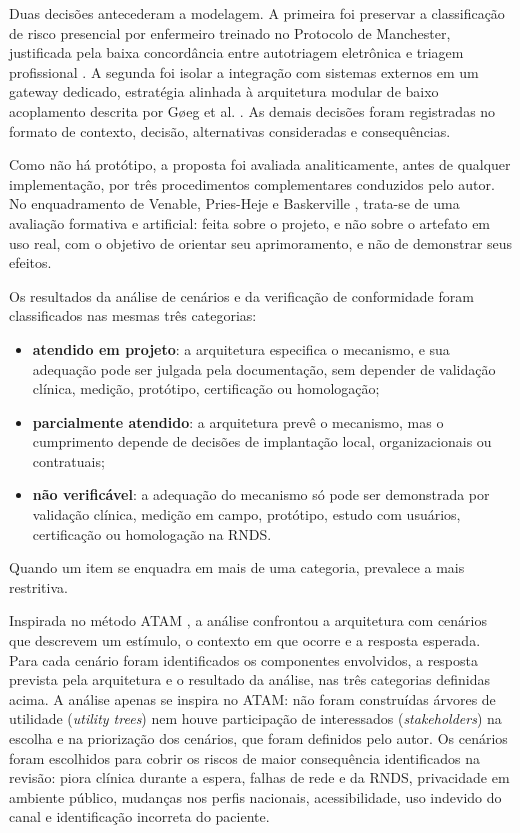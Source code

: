 Duas decisões antecederam a modelagem. A primeira foi preservar a classificação de risco presencial por enfermeiro treinado no Protocolo de Manchester, justificada pela baixa concordância entre autotriagem eletrônica e triagem profissional \cite{dickson2022}. A segunda foi isolar a integração com sistemas externos em um gateway dedicado, estratégia alinhada à arquitetura modular de baixo acoplamento descrita por Gøeg et al. \cite{goeg2018}. As demais decisões foram registradas no formato de contexto, decisão, alternativas consideradas e consequências.


Como não há protótipo, a proposta foi avaliada analiticamente, antes de qualquer implementação, por três procedimentos complementares conduzidos pelo autor. No enquadramento de Venable, Pries-Heje e Baskerville \cite{venable2016}, trata-se de uma avaliação formativa e artificial: feita sobre o projeto, e não sobre o artefato em uso real, com o objetivo de orientar seu aprimoramento, e não de demonstrar seus efeitos.

Os resultados da análise de cenários e da verificação de conformidade foram classificados nas mesmas três categorias:
\begin{itemize}
    \item \textbf{atendido em projeto}: a arquitetura especifica o mecanismo, e sua adequação pode ser julgada pela documentação, sem depender de validação clínica, medição, protótipo, certificação ou homologação;
    \item \textbf{parcialmente atendido}: a arquitetura prevê o mecanismo, mas o cumprimento depende de decisões de implantação local, organizacionais ou contratuais;
    \item \textbf{não verificável}: a adequação do mecanismo só pode ser demonstrada por validação clínica, medição em campo, protótipo, estudo com usuários, certificação ou homologação na RNDS.
\end{itemize}
Quando um item se enquadra em mais de uma categoria, prevalece a mais restritiva.


Inspirada no método ATAM \cite{kazman1998}, a análise confrontou a arquitetura com cenários que descrevem um estímulo, o contexto em que ocorre e a resposta esperada. Para cada cenário foram identificados os componentes envolvidos, a resposta prevista pela arquitetura e o resultado da análise, nas três categorias definidas acima. A análise apenas se inspira no ATAM: não foram construídas árvores de utilidade (\textit{utility trees}) nem houve participação de interessados (\textit{stakeholders}) na escolha e na priorização dos cenários, que foram definidos pelo autor. Os cenários foram escolhidos para cobrir os riscos de maior consequência identificados na revisão: piora clínica durante a espera, falhas de rede e da RNDS, privacidade em ambiente público, mudanças nos perfis nacionais, acessibilidade, uso indevido do canal e identificação incorreta do paciente.

